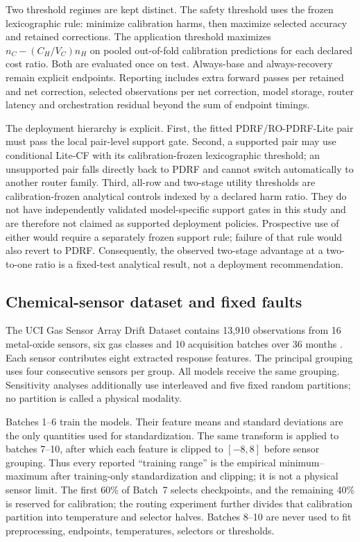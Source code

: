 \documentclass[11pt]{article}
\begin{document}
Two threshold regimes are kept distinct. The safety threshold uses the frozen lexicographic rule: minimize calibration harms, then maximize selected accuracy and retained corrections. The application threshold maximizes $n_C-(C_H/V_C)n_H$ on pooled out-of-fold calibration predictions for each declared cost ratio. Both are evaluated once on test. Always-base and always-recovery remain explicit endpoints. Reporting includes extra forward passes per retained and net correction, selected observations per net correction, model storage, router latency and orchestration residual beyond the sum of endpoint timings.

The deployment hierarchy is explicit. First, the fitted PDRF/RO-PDRF-Lite pair must pass the local pair-level support gate. Second, a supported pair may use conditional Lite-CF with its calibration-frozen lexicographic threshold; an unsupported pair falls directly back to PDRF and cannot switch automatically to another router family. Third, all-row and two-stage utility thresholds are calibration-frozen analytical controls indexed by a declared harm ratio. They do not have independently validated model-specific support gates in this study and are therefore not claimed as supported deployment policies. Prospective use of either would require a separately frozen support rule; failure of that rule would also revert to PDRF. Consequently, the observed two-stage advantage at a two-to-one ratio is a fixed-test analytical result, not a deployment recommendation.

\subsection{Chemical-sensor dataset and fixed faults}

The UCI Gas Sensor Array Drift Dataset contains 13,910 observations from 16 metal-oxide sensors, six gas classes and 10 acquisition batches over 36 months \citep{vergara2012dataset,vergara2012drift}. Each sensor contributes eight extracted response features. The principal grouping uses four consecutive sensors per group. All models receive the same grouping. Sensitivity analyses additionally use interleaved and five fixed random partitions; no partition is called a physical modality.

Batches 1--6 train the models. Their feature means and standard deviations are the only quantities used for standardization. The same transform is applied to batches 7--10, after which each feature is clipped to $[-8,8]$ before sensor grouping. Thus every reported ``training range'' is the empirical minimum--maximum after training-only standardization and clipping; it is not a physical sensor limit. The first 60\% of Batch~7 selects checkpoints, and the remaining 40\% is reserved for calibration; the routing experiment further divides that calibration partition into temperature and selector halves. Batches 8--10 are never used to fit preprocessing, endpoints, temperatures, selectors or thresholds.
\end{document}

